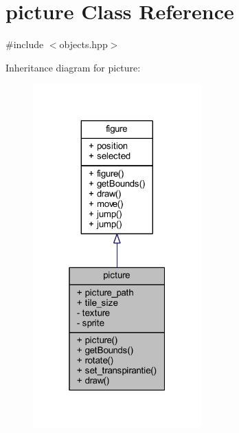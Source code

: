\hypertarget{classpicture}{}\section{picture Class Reference}
\label{classpicture}


{\ttfamily \#include $<$objects.\+hpp$>$}



Inheritance diagram for picture\+:
\nopagebreak
\begin{figure}[H]
\begin{center}
\leavevmode
\includegraphics[width=184pt]{classpicture__inherit__graph}
\end{center}
\end{figure}


